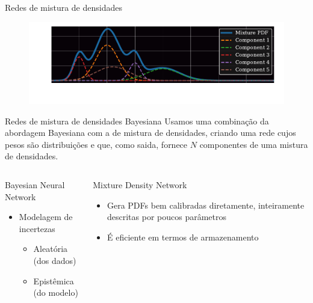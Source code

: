 \begin{frame}[c]{Redes de mistura de densidades}
    \begin{figure}
        \centering
        \includegraphics[width=\linewidth]{script/images/mixture_pdf_5comp.pdf}
    \end{figure}
\end{frame}

\begin{frame}[c]{Redes de mistura de densidades Bayesiana}
    Usamos uma combinação da abordagem Bayesiana com a de mistura de densidades, criando uma rede cujos pesos são distribuições e que, como saida, fornece $N$ componentes de uma mistura de densidades.

    \begin{columns}[c]
        \begin{column}{0.46\textwidth}
            \begin{splusbox}{Bayesian Neural Network}
                \begin{itemize}
                    \item Modelagem de incertezas
                    \begin{itemize}
                        \item Aleatória (dos dados)
                        \item Epistêmica (do modelo)
                    \end{itemize}
                \end{itemize}
            \end{splusbox}
        \end{column}
        \begin{column}{0.46\textwidth}
            \begin{splusbox}{Mixture Density Network}
                \begin{itemize}
                    \item Gera PDFs bem calibradas diretamente, inteiramente descritas por poucos parâmetros
                    \item É eficiente em termos de armazenamento
                \end{itemize}
            \end{splusbox}
        \end{column}
    \end{columns}


\end{frame}

